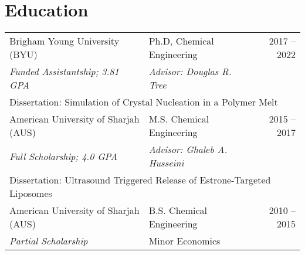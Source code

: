 \documentclass[letterpaper,11pt]{article}
\begin{document}
\section*{Education}
\begin{tabular}{@{}p{} p{} r@{}}
     Brigham Young University (BYU)                                                           & Ph.D, Chemical Engineering          & 2017 -- 2022 \\
     \multicolumn{1}{l}{\emph{Funded Assistantship; 3.81 GPA}}                                & \emph{Advisor: Douglas R. Tree}     &              \\
     \multicolumn{3}{l}{Dissertation: Simulation of Crystal Nucleation in a Polymer Melt}                                                          \\ [4pt]

     American University of Sharjah (AUS)                                                     & M.S. Chemical Engineering           & 2015 -- 2017 \\
     \multicolumn{1}{l}{\emph{Full Scholarship; 4.0 GPA}}                                     & \emph{Advisor: Ghaleb A. Husseini}  &              \\
     \multicolumn{3}{l}{Dissertation: Ultrasound Triggered Release of Estrone-Targeted Liposomes}                                                  \\ [4pt]

     American University of Sharjah (AUS)                                                     & B.S. Chemical Engineering           & 2010 -- 2015 \\
     \multicolumn{1}{l}{\emph{Partial Scholarship}}                                           & Minor Economics                     &              \\
\end{tabular}
\end{document}
